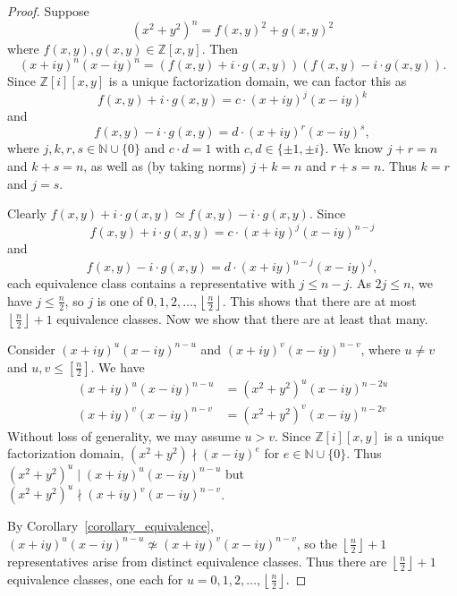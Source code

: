 \documentclass[12pt]{article}
\theoremstyle{definition}
\theoremstyle{remark}
\newcommand{\Nnn}{\mathbb N}
\newcommand{\Zzz}{\mathbb Z}
\newcommand{\divides}{\mid}
\newcommand{\notdivides}{\nmid}
\numberwithin{equation}{section}
\begin{document}
\begin{proof}
Suppose 
\[ (x^2 + y^2)^n = f(x,y)^2 + g(x,y)^2 \]
where \( f(x,y), g(x,y) \in \Zzz[x,y] \).
Then  
\[ (x + iy)^n (x -  iy)^n = ( f(x,y) + i \cdot g(x,y) ) ( f(x,y) - i \cdot g(x,y) ) .\]
Since \( \Zzz [i][x,y] \) is a unique factorization domain,
we can factor this as
\[ f(x,y) + i \cdot g(x,y) = c \cdot (x + iy)^j (x -  iy)^k \]
and
\[ f(x,y) - i \cdot g(x,y) = d \cdot (x + iy)^r (x -  iy)^s,\]
where \( j, k, r, s \in \Nnn \cup \{0\} \) and
\(c \cdot d = 1 \) with \( c,d \in \{ \pm 1 , \pm i \} \). 
We know \( j + r = n \) and \( k + s = n \), as well as
(by taking norms) \( j + k = n \) and \( r + s = n \).
Thus \(k = r\) and \(j = s\).

Clearly \( f(x,y) + i \cdot g(x,y) \simeq  f(x,y) - i \cdot g(x,y) \).
Since 
\[ 
f(x,y) + i \cdot g(x,y) = c \cdot (x + iy)^j (x -  iy)^{n-j} 
\]
and 
\[ 
f(x,y) - i \cdot g(x,y) = d \cdot (x + iy)^{n-j} (x -  iy)^j,
\]
each equivalence class contains a representative with \( j \leq n - j
\).  As \( 2j \leq n \), we have \( j \leq \frac{n}{2} \), so \( j \)
is one of \( 0, 1, 2, \ldots, \left\lfloor \frac{n}{2} \right\rfloor \). This shows
that there are at most \( \left\lfloor \frac{n}{2} \right\rfloor + 1 \)
equivalence classes. Now we show that there are at least that many.



Consider \( (x + iy)^u (x -  iy)^{n-u} \)  and \( (x + iy)^v (x -  iy)^{n-v} \),
where \( u \neq v \) and \(u,v \leq [ \frac{n}{2} ] \). We have
\begin{align*}
(x + iy)^u (x -  iy)^{n-u} &= (x^2 + y^2)^u (x -  iy)^{n-2u}
\\
(x + iy)^v (x -  iy)^{n-v} &= (x^2 + y^2)^v (x -  iy)^{n-2v}
\end{align*}
Without loss of generality, we may assume \( u > v \). 
Since \( \Zzz [i][x,y] \) is a unique factorization domain,
\( (x^2 + y^2) \notdivides (x -  iy)^e \) for \( e \in \Nnn \cup \{ 0 \} \).
Thus \( (x^2 + y^2)^u \divides (x + iy)^u (x -  iy)^{n-u} \)
but \( (x^2 + y^2)^u \notdivides (x + iy)^v (x -  iy)^{n-v} \).

By Corollary~\ref{corollary_equivalence},
\( (x + iy)^u (x -  iy)^{n-u} \not\simeq (x + iy)^v (x -  iy)^{n-v} \), 
so the \( \left\lfloor \frac{n}{2} \right\rfloor + 1 \) representatives arise from
distinct equivalence classes.
Thus there are \( \left\lfloor \frac{n}{2} \right\rfloor + 1 \) equivalence classes, 
one each for \( u = 0, 1, 2, \ldots,  \left\lfloor \frac{n}{2} \right\rfloor \).
\end{proof}
\end{document}
